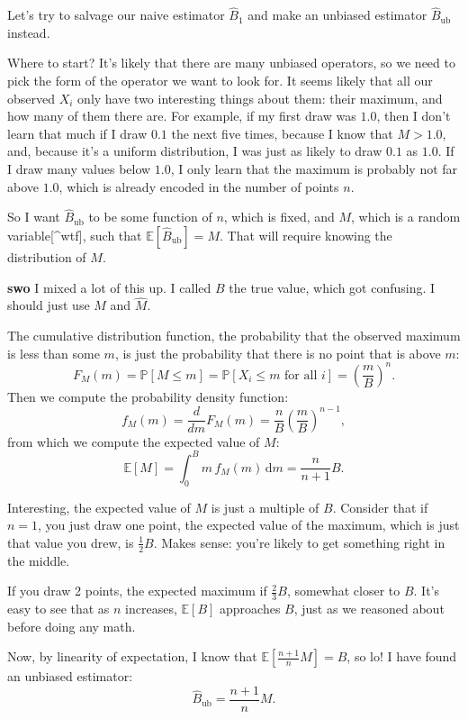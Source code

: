 \documentclass{book}
\begin{document}
Let's try to salvage our naive estimator \(\hat{B}_1\) and make an
unbiased estimator \(\hat{B}_\mathrm{ub}\) instead.

Where to start? It's likely that there are many unbiased operators, so
we need to pick the form of the operator we want to look for. It seems
likely that all our observed \(X_i\) only have two interesting things
about them: their maximum, and how many of them there are. For example,
if my first draw was \(1.0\), then I don't learn that much if I draw
\(0.1\) the next five times, because I know that \(M > 1.0\), and,
because it's a uniform distribution, I was just as likely to draw
\(0.1\) as \(1.0\). If I draw many values below \(1.0\), I only learn
that the maximum is probably not far above \(1.0\), which is already
encoded in the number of points \(n\).

So I want \(\hat{B}_\mathrm{ub}\) to be some function of \(n\), which is
fixed, and \(M\), which is a random variable{[}\^{}wtf{]}, such that
\(\mathbb{E}[\hat{B}_\mathrm{ub}] = M\). That will require knowing the
distribution of \(M\).

\textbf{swo} I mixed a lot of this up. I called \(B\) the true value,
which got confusing. I should just use \(M\) and \(\hat{M}\).

The cumulative distribution function, the probability that the observed
maximum is less than some \(m\), is just the probability that there is
no point that is above \(m\): \[
F_M(m) = \mathbb{P}[M \leq m] = \mathbb{P}[X_i \leq m \text{ for all } i] = \left( \frac{m}{B} \right)^n.
\] Then we compute the probability density function: \[
f_M(m) = \frac{d}{dm} F_M(m) = \frac{n}{B} \left( \frac{m}{B} \right)^{n-1},
\] from which we compute the expected value of \(M\): \[
\mathbb{E}[M] = \int_0^B m \, f_M(m) \, \mathrm{d}m = \frac{n}{n+1} B.
\]

Interesting, the expected value of \(M\) is just a multiple of \(B\).
Consider that if \(n=1\), you just draw one point, the expected value of
the maximum, which is just that value you drew, is \(\tfrac{1}{2} B\).
Makes sense: you're likely to get something right in the middle.

If you draw 2 points, the expected maximum if \(\tfrac{2}{3}B\),
somewhat closer to \(B\). It's easy to see that as \(n\) increases,
\(\mathbb{E}[B]\) approaches \(B\), just as we reasoned about before
doing any math.

Now, by linearity of expectation, I know that
\(\mathbb{E}\left[\tfrac{n+1}{n} M \right] = B\), so lo! I have found an
unbiased estimator: \[
\hat{B}_\mathrm{ub} = \frac{n+1}{n} M.
\]
\end{document}
